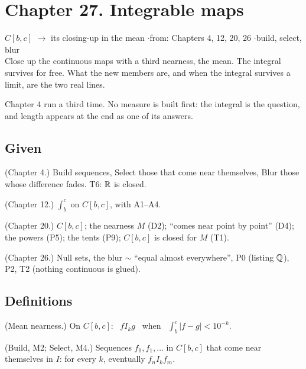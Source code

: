 \newpage

\section*{Chapter 27. Integrable maps}
\begin{center}
{\normalsize $C[b,c]$ $\to$ its closing-up in the mean \quad$\cdot$\quad from: Chapters 4, 12, 20, 26 \quad$\cdot$\quad build, select, blur}\\[4pt]
{\small Close up the continuous maps with a third nearness, the mean. The integral survives for free. What the new members are, and when the integral survives a limit, are the two real lines.}
\end{center}

Chapter 4 run a third time. No measure is built first: the integral is the question, and length appears at the end as one of its answers.

\subsection*{Given}

\begin{lines}
\item[\lab{G1}] (Chapter 4.) Build sequences, Select those that come near themselves, Blur those whose difference fades. T6: $\mathbb{R}$ is closed.
\item[\lab{G2}] (Chapter 12.) $\int_b^c$ on $C[b,c]$, with A1--A4.
\item[\lab{G3}] (Chapter 20.) $C[b,c]$; the nearness $M$ (D2); ``comes near point by point'' (D4); the powers (P5); the tents (P9); $C[b,c]$ is closed for $M$ (T1).
\item[\lab{G4}] (Chapter 26.) Null sets, the blur $\sim$ ``equal almost everywhere'', P0 (listing $\mathbb{Q}$), P2, T2 (nothing continuous is glued).
\end{lines}

\subsection*{Definitions}

\begin{lines}
\item[\lab{D1}] (Mean nearness.) On $C[b,c]$: \ $f \mathrel{I_k} g$ \ when \ $\int_b^c |f - g| < 10^{-k}$.
\item[\lab{D2}] (Build, M2; Select, M4.) Sequences $f_0, f_1, \dots$ in $C[b,c]$ that come near themselves in $I$: for every $k$, eventually $f_n \mathrel{I_k} f_m$.
\end{lines}


